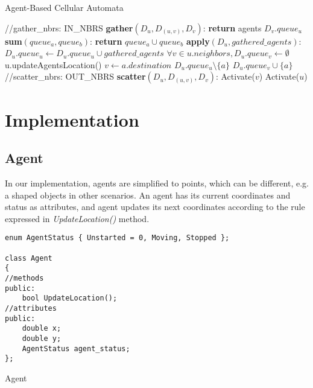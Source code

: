 	\begin{Algorithmus}[H]
	\label{alg:GAS_ABCA}
	\caption{Agent-Based Cellular Automata}	
	\begin{algorithmic}[1]
	\State //gather\_nbrs: IN\_NBRS
	\State \textbf{gather}$(D_u, D_{(u,v)}, D_v)$: 
	\State \textbf{return} agents $D_v.queue_u$
	\newline
	\State \textbf{sum}$(queue_a, queue_b)$: 
	\State \textbf{return} $queue_a \cup queue_b$
	\newline
	\State \textbf{apply}$(D_u, gathered\_agents)$:
	\State $D_u.queue_u \leftarrow D_u.queue_u \cup gathered\_agents$
	\State $\forall v \in u.neighbors, D_u.queue_v \leftarrow \emptyset $
	\State u.updateAgentsLocation()
			\State $v \leftarrow a.destination$
			\State $D_u.queue_u \setminus \{a\}$
			\State $D_u.queue_v \cup \{a\}$
		\EndIf
	\EndFor
	\newline	
	\State //scatter\_nbrs: OUT\_NBRS
	\State \textbf{scatter}$(D_u, D_{(u,v)}, D_v)$: 
		\State 	Activate($v$)
	\EndIf
		\State 	Activate($u$)
	\EndIf
	\end{algorithmic}
	\end{Algorithmus}

\section{Implementation}

\subsection{Agent}

In our implementation, agents are simplified to points, which can be different, e.g. a shaped objects in other scenarios. An agent has its current coordinates and status as attributes, and agent updates its next coordinates according to the rule expressed in \textit{UpdateLocation()} method.

\begin{Listing}[H]
\begin{lstlisting}
enum AgentStatus { Unstarted = 0, Moving, Stopped };

class Agent
{
//methods
public:
	bool UpdateLocation();
//attributes		
public:
	double x;
	double y;
	AgentStatus agent_status;
};
\end{lstlisting}
\caption{Agent}
\label{lst:Agent}
\end{Listing}

